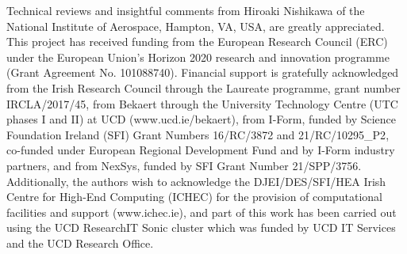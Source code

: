 \documentclass[sn-mathphys,Numbered]{sn-jnl}%
\begin{document}
\backmatter

Technical reviews and insightful comments from Hiroaki Nishikawa of the National Institute of Aerospace, Hampton, VA, USA, are greatly appreciated.
This project has received funding from the European Research Council (ERC) under the European Union’s Horizon 2020 research and innovation programme (Grant Agreement No. 101088740).
Financial support is gratefully acknowledged from the Irish Research Council
through the Laureate programme, grant number IRCLA/2017/45, from Bekaert through
the University Technology Centre (UTC phases I and II) at UCD
(www.ucd.ie/bekaert), from I-Form, funded by Science Foundation Ireland (SFI)
Grant Numbers {16/RC/3872} and {21/RC/10295_P2}, co-funded under European Regional Development Fund and by I-Form industry partners, and from NexSys, funded by SFI Grant Number 21/SPP/3756.
Additionally, the authors wish to acknowledge the DJEI/DES/SFI/HEA Irish Centre for High-End Computing (ICHEC) for the provision of computational facilities and support (www.ichec.ie), and part of this work has been carried out using the UCD ResearchIT Sonic cluster which was funded by UCD IT Services and the UCD Research Office.



\newpage
\end{document}
